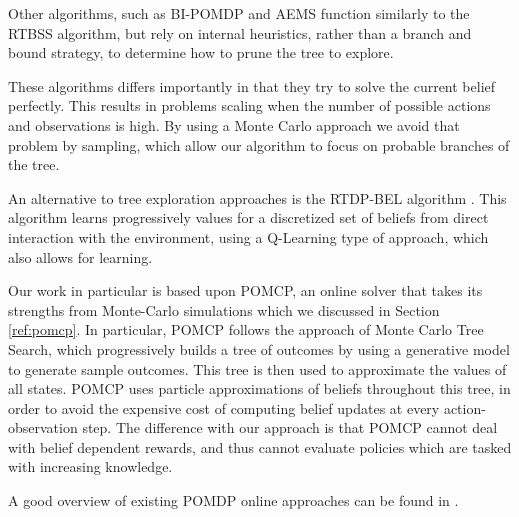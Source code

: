 Other algorithms, such as BI-POMDP \cite{cit:relworkonlinebi} and AEMS \cite{cit:relworkonlineaems}
function similarly to the RTBSS algorithm, but rely on internal heuristics, rather than a branch and
bound strategy, to determine how to prune the tree to explore.

These algorithms differs importantly in that they try to solve the current belief perfectly. This
results in problems scaling when the number of possible actions and observations is high. By using
a Monte Carlo approach we avoid that problem by sampling, which allow our algorithm to focus on
probable branches of the tree.

An alternative to tree exploration approaches is the RTDP-BEL algorithm \cite{cit:relworkonlineq}.
This algorithm learns progressively values for a discretized set of beliefs from direct interaction
with the environment, using a Q-Learning type of approach, which also allows for learning.

Our work in particular is based upon POMCP, an online solver that takes its strengths from
Monte-Carlo simulations \cite{cit:pomcp} which we discussed in Section \ref{ref:pomcp}. In
particular, POMCP follows the approach of Monte Carlo Tree Search, which progressively builds a tree
of outcomes by using a generative model to generate sample outcomes. This tree is then used to
approximate the values of all states. POMCP uses particle approximations of beliefs throughout this
tree, in order to avoid the expensive cost of computing belief updates at every action-observation
step. The difference with our approach is that POMCP cannot deal with belief dependent rewards, and
thus cannot evaluate policies which are tasked with increasing knowledge.

A good overview of existing POMDP online approaches can be found in \cite{cit:relworkonlineall}.
